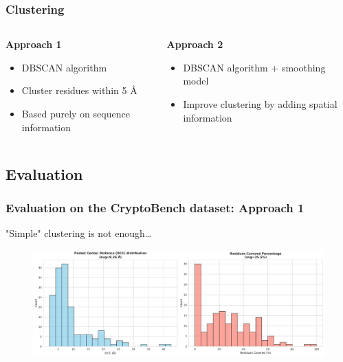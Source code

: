 \documentclass[aspectratio=169]{beamer}
\begin{document}
\begin{frame}
  \frametitle{Clustering}

  \begin{columns}
    \begin{column}{0.5\textwidth}
      \textbf{Approach 1}
      \begin{itemize}
        \item DBSCAN algorithm
        \item Cluster residues within 5 \AA
        \item Based purely on sequence information
      \end{itemize}
    \end{column}
    \begin{column}{0.5\textwidth}
      \textbf{Approach 2}
      \begin{itemize}
        \item DBSCAN algorithm + smoothing model
        \item Improve clustering by adding spatial information
      \end{itemize}
    \end{column}
  \end{columns}

\end{frame}

\subsection{Evaluation}

\begin{frame}
  \frametitle{Evaluation on the CryptoBench dataset: Approach 1}

  "Simple" clustering is not enough\dots

  \begin{figure}
    \includegraphics[width=\textwidth]{fig/non-smoothened-1.pdf}
  \end{figure}
\end{frame}
\end{document}
